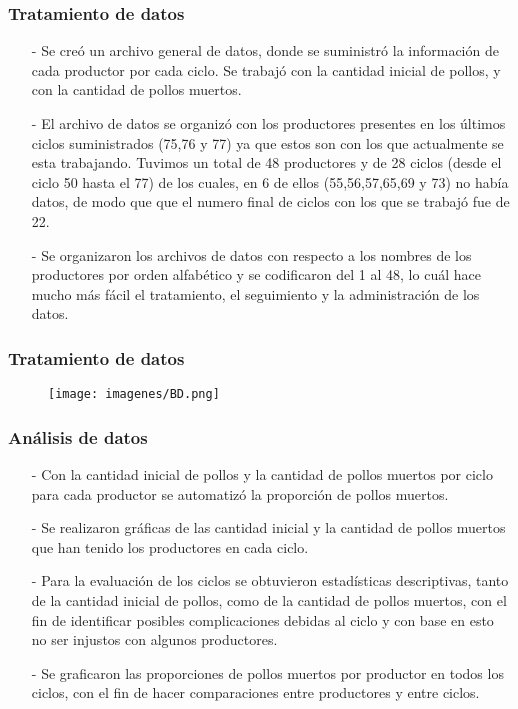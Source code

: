 \documentclass[11pt]{beamer}
\begin{document}
\begin{frame}
\frametitle{Tratamiento de datos}
\begin{itemize}
\justifying
\item[-]Se creó un archivo general de datos, donde se suministró la información de cada productor por cada ciclo. Se trabajó con la cantidad inicial de pollos, y con la cantidad de pollos muertos.
\item[-]El archivo de datos se organizó con los productores presentes en los últimos ciclos suministrados (75,76 y 77) ya que estos son con los que actualmente se esta trabajando. Tuvimos un total de 48 productores y de 28 ciclos (desde el ciclo 50 hasta el 77) de los cuales, en 6 de ellos (55,56,57,65,69 y 73) no había datos, de modo que que el numero final de ciclos con los que se trabajó fue de 22.
\item[-]Se organizaron los archivos de datos con respecto a los nombres de los productores por orden alfabético y se codificaron del 1 al 48, lo cuál hace mucho más fácil el tratamiento, el seguimiento y la administración de los datos.
\end{itemize}
\end{frame}

\begin{frame}
\frametitle{Tratamiento de datos}
\begin{figure}[!h]
        \texttt{[image: imagenes/BD.png]}
        \label{figura1}
\end{figure}
\end{frame}


\begin{frame}
\frametitle{Análisis de datos}
\begin{itemize}
\justifying
\item[-]Con la cantidad inicial de pollos y la cantidad de pollos muertos por ciclo para cada productor se automatizó la proporción de pollos muertos.
\item[-]Se realizaron gráficas de las cantidad inicial y la cantidad de pollos muertos que han tenido los productores en cada ciclo.
\item[-]Para la evaluación de los ciclos se obtuvieron estadísticas descriptivas, tanto de la cantidad inicial de pollos, como de la cantidad de pollos muertos, con el fin de identificar posibles complicaciones debidas al ciclo y con base en esto no ser injustos con algunos productores.
\item[-]Se graficaron las proporciones de pollos muertos por productor en todos los ciclos, con el fin de hacer comparaciones entre productores y entre ciclos.
\end{itemize}
\end{frame}
\end{document}
